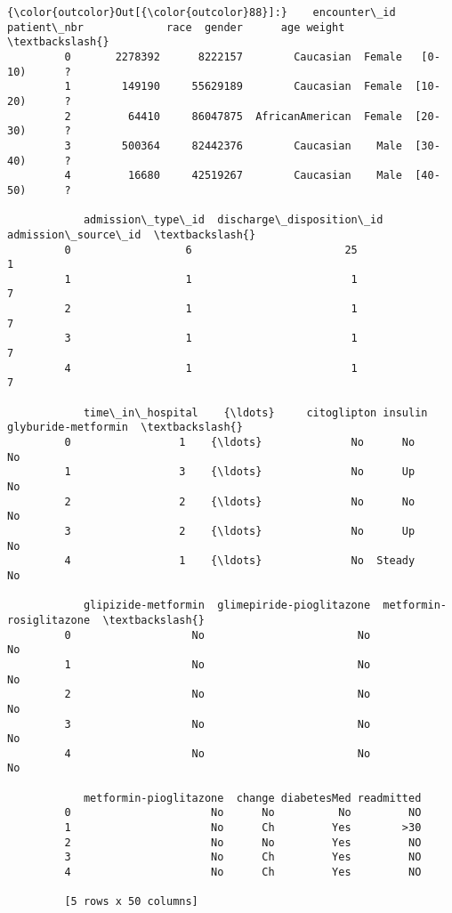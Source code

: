 \documentclass[11pt]{article}
\begin{document}
\begin{Verbatim}[commandchars=\\\{\}]
{\color{outcolor}Out[{\color{outcolor}88}]:}    encounter\_id  patient\_nbr             race  gender      age weight  \textbackslash{}
         0       2278392      8222157        Caucasian  Female   [0-10)      ?   
         1        149190     55629189        Caucasian  Female  [10-20)      ?   
         2         64410     86047875  AfricanAmerican  Female  [20-30)      ?   
         3        500364     82442376        Caucasian    Male  [30-40)      ?   
         4         16680     42519267        Caucasian    Male  [40-50)      ?   
         
            admission\_type\_id  discharge\_disposition\_id  admission\_source\_id  \textbackslash{}
         0                  6                        25                    1   
         1                  1                         1                    7   
         2                  1                         1                    7   
         3                  1                         1                    7   
         4                  1                         1                    7   
         
            time\_in\_hospital    {\ldots}     citoglipton insulin  glyburide-metformin  \textbackslash{}
         0                 1    {\ldots}              No      No                   No   
         1                 3    {\ldots}              No      Up                   No   
         2                 2    {\ldots}              No      No                   No   
         3                 2    {\ldots}              No      Up                   No   
         4                 1    {\ldots}              No  Steady                   No   
         
            glipizide-metformin  glimepiride-pioglitazone  metformin-rosiglitazone  \textbackslash{}
         0                   No                        No                       No   
         1                   No                        No                       No   
         2                   No                        No                       No   
         3                   No                        No                       No   
         4                   No                        No                       No   
         
            metformin-pioglitazone  change diabetesMed readmitted  
         0                      No      No          No         NO  
         1                      No      Ch         Yes        >30  
         2                      No      No         Yes         NO  
         3                      No      Ch         Yes         NO  
         4                      No      Ch         Yes         NO  
         
         [5 rows x 50 columns]
\end{Verbatim}
            
\end{document}
